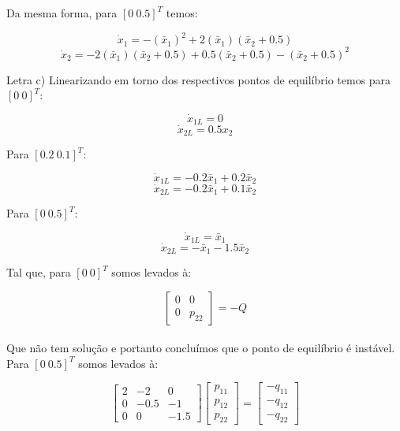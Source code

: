 \noindent Da mesma forma, para $[0~0.5]^T$ temos:

\begin{equation}
\dot{x}_1=-(\bar{x}_1)^2 + 2(\bar{x}_1)(\bar{x}_2+0.5)
\end{equation}
\begin{equation}
\dot{x}_2=-2(\bar{x}_1)(\bar{x}_2+0.5) + 0.5(\bar{x}_2+0.5)-(\bar{x}_2+0.5)^2 
\end{equation} 

Letra c) Linearizando em torno dos respectivos pontos de equilíbrio temos para $[0~0]^T$:

\begin{equation}
\dot{x}_{1L}=0
\end{equation}
\begin{equation}
\dot{x}_{2L}=0.5x_2
\end{equation}

\noindent Para $[0.2~0.1]^T$:

\begin{equation}
\dot{x}_{1L}=-0.2\bar{x}_1 + 0.2\bar{x}_2
\end{equation}
\begin{equation}
\dot{x}_{2L}=-0.2\bar{x}_1 + 0.1\bar{x}_2
\end{equation}

\noindent Para $[0~0.5]^T$:

\begin{equation}
\dot{x}_{1L}=\bar{x}_1
\end{equation}
\begin{equation}
\dot{x}_{2L}=-\bar{x}_1 - 1.5\bar{x}_2
\end{equation}

Tal que, para $[0~0]^T$ somos levados à:

\begin{equation}
\begin{bmatrix}
0 & 0\\
0 & p_{22}
\end{bmatrix}
=
-Q
\end{equation}
\\

Que não tem solução e portanto concluímos que o ponto de equilíbrio é instável.\\

Para $[0~0.5]^T$ somos levados à:

\begin{equation}
\begin{bmatrix}
2 & -2 & 0\\
0 & -0.5 & -1\\
0 & 0 & -1.5
\end{bmatrix}
\begin{bmatrix}
p_{11}\\
p_{12}\\
p_{22}
\end{bmatrix}
=
\begin{bmatrix}
-q_{11}\\
-q_{12}\\
-q_{22}
\end{bmatrix}
\end{equation}


